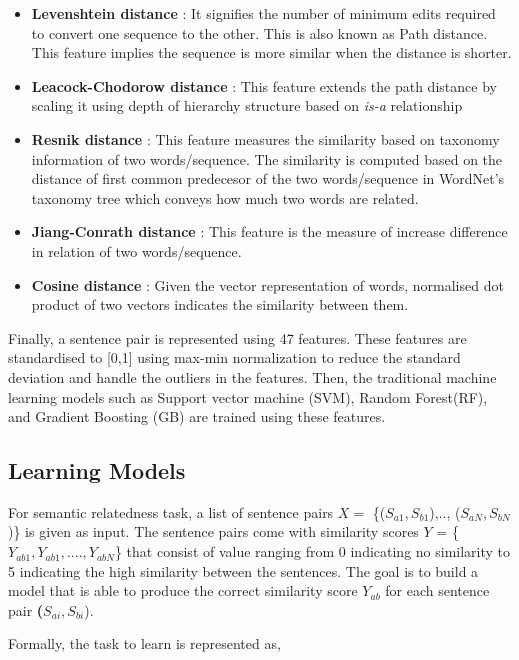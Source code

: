 \documentclass[12pt]{report} %
\begin{document}
	\begin{itemize}
		\item \textbf{Levenshtein distance} : It signifies the number of minimum edits required to convert one sequence to the other. This is also known as Path distance. This feature  implies the sequence is more similar when the distance is shorter. 
		\item\textbf{Leacock-Chodorow distance} : This feature extends the path distance by scaling it using depth of hierarchy structure based on \textit{is-a } relationship
		\item \textbf{Resnik distance} : This feature measures the similarity based on taxonomy information of two words/sequence. The similarity is computed based on the distance of first common predecesor of the two words/sequence in WordNet's taxonomy tree which conveys how much two words are related.
		
		\item \textbf{Jiang-Conrath distance} : This feature is the measure of increase difference in relation of two words/sequence.  
		\item \textbf{Cosine distance} : Given the vector representation of words, normalised dot product of two vectors indicates the similarity between them.
	\end{itemize}
	
	Finally, a sentence pair is represented using 47 features. These features are standardised to [0,1] using max-min normalization to reduce the standard deviation and handle the outliers in the features. Then, the traditional machine learning models such as Support vector machine (SVM), Random Forest(RF), and Gradient Boosting (GB) are trained using these features.
	
	\subsection{Learning Models}  
	
	For semantic relatedness task, a list of sentence pairs $X =$ \{($S_{a1},S_{b1}$),.., ($S_{aN},S_{bN}$)\} is given as input. The sentence pairs come with similarity scores $Y$ = \{$Y_{ab1}, Y_{ab1},...., Y_{abN}$\} that consist of value ranging from 0 indicating no similarity to 5 indicating the high similarity between the sentences. The goal is to build a model that is able to produce the correct similarity score $Y_{ab}$ for each sentence pair \textbf($S_{ai},S_{bi}$).
	
	Formally, the task to learn is represented as,
	
\end{document}
